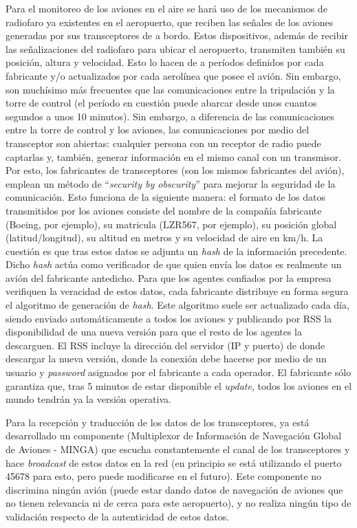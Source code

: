 Para el monitoreo de los aviones en el aire se hará uso de los mecanismos de radiofaro ya existentes en el aeropuerto, que reciben las señales de los aviones generadas por sus transceptores de a bordo. Estos dispositivos, además de recibir las señalizaciones del radiofaro para ubicar el aeropuerto, transmiten también su posición, altura y velocidad. Esto lo hacen de a períodos definidos por cada fabricante y/o actualizados por cada aerolínea que posee el avión. Sin embargo, son muchísimo más frecuentes que las comunicaciones entre la tripulación y la torre de control (el período en cuestión puede abarcar desde unos cuantos segundos a unos 10 minutos). Sin embargo, a diferencia de las comunicaciones entre la torre de control y los aviones, las comunicaciones por medio del transceptor son abiertas: cualquier persona con un receptor de radio puede captarlas y, también, generar información en el mismo canal con un transmisor. Por esto, los fabricantes de transceptores (son los mismos fabricantes del avión), emplean un método de ``\emph{security by obscurity}'' para mejorar la seguridad de la comunicación. Esto funciona de la siguiente manera: el formato de los datos transmitidos por los aviones consiste del nombre de la compañía fabricante (Boeing, por ejemplo), su matricula (LZR567, por ejemplo), su posición global (latitud/longitud), su altitud en metros y su velocidad de aire en km/h. La cuestión es que tras estos datos se adjunta un \emph{hash} de la información precedente. Dicho \emph{hash} actúa como verificador de que quien envía los datos es realmente un avión del fabricante antedicho. Para que los agentes confiados por la empresa verifiquen la veracidad de estos datos, cada fabricante distribuye en forma segura el algoritmo de generación de \emph{hash}. Este algoritmo suele ser actualizado cada día, siendo enviado automáticamente a todos los aviones y publicando por RSS la disponibilidad de una nueva versión para que el resto de los agentes la descarguen. El RSS incluye la dirección del servidor (IP y puerto) de donde descargar la nueva versión, donde la conexión debe hacerse por medio de un usuario y \emph{password} asignados por el fabricante a cada operador. El fabricante sólo garantiza que, tras 5 minutos de estar disponible el \emph{update}, todos los aviones en el mundo tendrán ya la versión operativa.

Para la recepción y traducción de los datos de los transceptores, ya está desarrollado un componente (Multiplexor de Información de Navegación Global de Aviones - \textsc{MINGA}) que escucha constantemente el canal de los transceptores y hace \emph{broadcast} de estos datos en la red (en principio se está utilizando el puerto 45678 para esto, pero puede modificarse en el futuro). Este componente no discrimina ningún avión (puede estar dando datos de navegación de aviones que no tienen relevancia ni de cerca para este aeropuerto), y no realiza ningún tipo de validación respecto de la autenticidad de estos datos.

